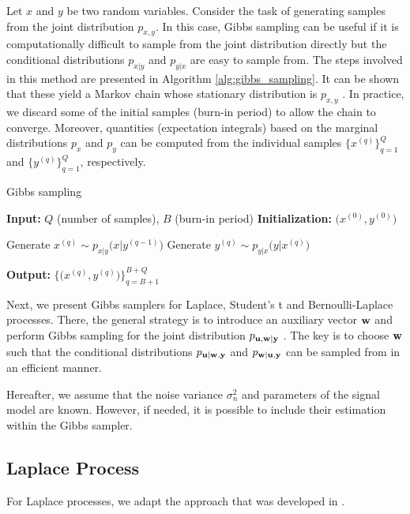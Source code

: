 \documentclass[journal]{IEEEtran}
\begin{document}
Let $x$ and $y$ be two random variables. Consider the task of generating samples from the joint distribution $p_{x, y}$. In this case, Gibbs sampling can be useful if it is computationally difficult to sample from the joint distribution directly but the conditional distributions $p_{x | y}$ and $p_{y |x}$ are easy to sample from. The steps involved in this method are presented in Algorithm \ref{alg:gibbs_sampling}. It can be shown that these yield a Markov chain whose stationary distribution is $p_{x, y}$ \cite{casella1992explaining}. In practice, we discard some of the initial samples (burn-in period) to allow the chain to converge. Moreover, quantities (expectation integrals) based on the marginal distributions $p_{x}$ and $p_{y}$ can be computed from the individual samples $\{x^{(q)}\}_{q=1}^{Q}$ and $\{y^{(q)}\}_{q=1}^{Q}$, respectively.

\begin{algorithm}[t]
    \caption{Gibbs sampling}
    \begin{algorithmic}[1]
      \State \textbf{Input:} $Q$ (number of samples), $B$ (burn-in period)
      \State \textbf{Initialization:} $\big(x^{(0)}, y^{(0)}\big)$

        \State Generate $x^{(q)} \sim p_{x | y}\big(x | y^{(q-1)}\big)$
        \State Generate $y^{(q)} \sim p_{y | x}\big(y | x^{(q)}\big)$
      \EndFor

      \State \textbf{Output:} $\Big\{\big(x^{(q)}, y^{(q)}\big)\Big\}_{q=B+1}^{B+Q}$
    \end{algorithmic}
    \label{alg:gibbs_sampling}
  \end{algorithm}

Next, we present Gibbs samplers for Laplace, Student's t and Bernoulli-Laplace processes. There, the general strategy is to introduce an auxiliary vector ${\bf{w}}$ and perform Gibbs sampling for the joint distribution $p_{{\bf{u}}, {\bf{w}} | {\bf{y}}}$ \cite{tanner1987calculation,mira1997use}. The key is to choose ${\bf{w}}$ such that the conditional distributions $p_{{\bf{u}} | {\bf{w}}, {\bf{y}}}$ and $p_{{\bf{w}} | {\bf{u}}, {\bf{y}}}$ can be sampled from in an efficient manner.

Hereafter, we assume that the noise variance $\sigma_{n}^{2}$ and parameters of the signal model are known. However, if needed, it is possible to include their estimation within the Gibbs sampler.


\subsection{Laplace Process}
For Laplace processes, we adapt the approach that was developed in \cite{park2008bayesian}.
\end{document}
